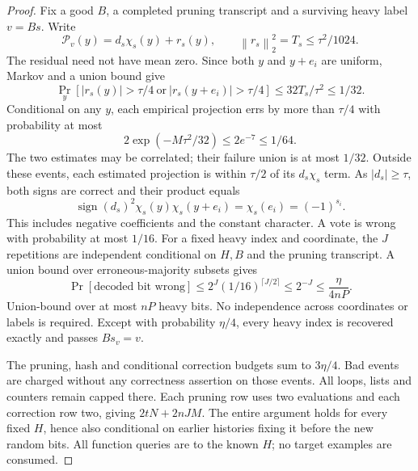 \documentclass[11pt]{article}
\theoremstyle{remark}\newtheorem{remark}[theorem]{Remark}
\newcommand{\sgn}{\operatorname{sign}}
\newcommand{\norm}[1]{\left\|#1\right\|}
\begin{document}
\begin{proof}
Fix a good $B$, a completed pruning transcript and a surviving heavy label $v=Bs$. Write
\[
 \mathcal P_v(y)=d_s\chi_s(y)+r_s(y),\qquad
 \norm{r_s}_2^2=T_s\le\tau^2/1024.
\]
The residual need not have mean zero. Since both $y$ and $y+e_i$ are uniform, Markov and a union bound give
\[
 \Pr_y[|r_s(y)|>\tau/4\ \text{or}\ |r_s(y+e_i)|>\tau/4]
 \le32T_s/\tau^2\le1/32.
\]
Conditional on any $y$, each empirical projection errs by more than $\tau/4$ with probability at most
\[
 2\exp(-M\tau^2/32)\le2e^{-7}\le1/64.
\]
The two estimates may be correlated; their failure union is at most $1/32$. Outside these events, each estimated projection is within $\tau/2$ of its $d_s\chi_s$ term. As $|d_s|\ge\tau$, both signs are correct and their product equals
\[
 \sgn(d_s)^2\chi_s(y)\chi_s(y+e_i)
 =\chi_s(e_i)=(-1)^{s_i}.
\]
This includes negative coefficients and the constant character. A vote is wrong with probability at most $1/16$. For a fixed heavy index and coordinate, the $J$ repetitions are independent conditional on $H,B$ and the pruning transcript. A union bound over erroneous-majority subsets gives
\[
 \Pr[\text{decoded bit wrong}]\le2^J(1/16)^{\lceil J/2\rceil}
 \le2^{-J}\le\frac{\eta}{4nP}.
\]
Union-bound over at most $nP$ heavy bits. No independence across coordinates or labels is required. Except with probability $\eta/4$, every heavy index is recovered exactly and passes $Bs_v=v$.

The pruning, hash and conditional correction budgets sum to $3\eta/4$. Bad events are charged without any correctness assertion on those events. All loops, lists and counters remain capped there. Each pruning row uses two evaluations and each correction row two, giving $2tN+2nJM$. The entire argument holds for every fixed $H$, hence also conditional on earlier histories fixing it before the new random bits. All function queries are to the known $H$; no target examples are consumed.
\end{proof}
\end{document}
